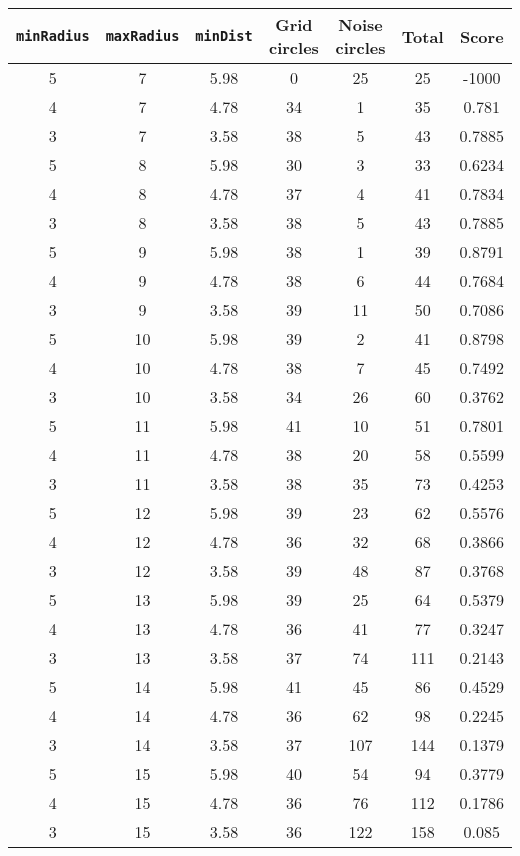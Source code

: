 \documentclass[letterpaper, 12pt]{article}
\begin{document}
\begin{longtable}{|c|c|c|c|c|c|c|}
\hline
\textbf{\texttt{minRadius}} & \textbf{\texttt{maxRadius}} & \textbf{\texttt{minDist}} & \textbf{Grid circles} & \textbf{Noise circles} & \textbf{Total} & \textbf{Score} \\
\hline
5 & 7 & 5.98 & 0 & 25 & 25 & -1000 \\
\hline
4 & 7 & 4.78 & 34 & 1 & 35 & 0.781 \\
\hline
3 & 7 & 3.58 & 38 & 5 & 43 & 0.7885 \\
\hline
5 & 8 & 5.98 & 30 & 3 & 33 & 0.6234 \\
\hline
4 & 8 & 4.78 & 37 & 4 & 41 & 0.7834 \\
\hline
3 & 8 & 3.58 & 38 & 5 & 43 & 0.7885 \\
\hline
5 & 9 & 5.98 & 38 & 1 & 39 & 0.8791 \\
\hline
4 & 9 & 4.78 & 38 & 6 & 44 & 0.7684 \\
\hline
3 & 9 & 3.58 & 39 & 11 & 50 & 0.7086 \\
\hline
5 & 10 & 5.98 & 39 & 2 & 41 & 0.8798 \\
\hline
4 & 10 & 4.78 & 38 & 7 & 45 & 0.7492 \\
\hline
3 & 10 & 3.58 & 34 & 26 & 60 & 0.3762 \\
\hline
5 & 11 & 5.98 & 41 & 10 & 51 & 0.7801 \\
\hline
4 & 11 & 4.78 & 38 & 20 & 58 & 0.5599 \\
\hline
3 & 11 & 3.58 & 38 & 35 & 73 & 0.4253 \\
\hline
5 & 12 & 5.98 & 39 & 23 & 62 & 0.5576 \\
\hline
4 & 12 & 4.78 & 36 & 32 & 68 & 0.3866 \\
\hline
3 & 12 & 3.58 & 39 & 48 & 87 & 0.3768 \\
\hline
5 & 13 & 5.98 & 39 & 25 & 64 & 0.5379 \\
\hline
4 & 13 & 4.78 & 36 & 41 & 77 & 0.3247 \\
\hline
3 & 13 & 3.58 & 37 & 74 & 111 & 0.2143 \\
\hline
5 & 14 & 5.98 & 41 & 45 & 86 & 0.4529 \\
\hline
4 & 14 & 4.78 & 36 & 62 & 98 & 0.2245 \\
\hline
3 & 14 & 3.58 & 37 & 107 & 144 & 0.1379 \\
\hline
5 & 15 & 5.98 & 40 & 54 & 94 & 0.3779 \\
\hline
4 & 15 & 4.78 & 36 & 76 & 112 & 0.1786 \\
\hline
3 & 15 & 3.58 & 36 & 122 & 158 & 0.085 \\

\end{longtable}
\end{document}
